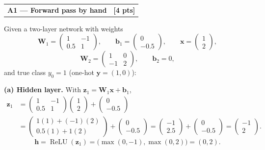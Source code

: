 \documentclass[10pt,a4paper]{article}
\makeatletter
\newcommand{\vect}[1]{\bm{#1}}
\newcommand{\qtitle}[2]{%
  \vspace{5pt}
  \noindent\begin{tabularx}{\linewidth}{@{}Xr@{}}
  {\sffamily\bfseries\color{AANavy}#1} & {\sffamily\bfseries\color{AANavy}#2}
  \end{tabularx}\vspace{1pt}
}
\makeatother
\begin{document}
\qtitle{A1 --- Forward pass by hand}{[4 pts]}
\begin{answerbox}
Given a two-layer network with weights
\[
\vect W_1=\begin{pmatrix}1&-1\\0.5&1\end{pmatrix},\qquad
\vect b_1=\begin{pmatrix}0\\-0.5\end{pmatrix},\qquad
\vect x=\begin{pmatrix}1\\2\end{pmatrix},
\]
\[
\vect W_2=\begin{pmatrix}1&0\\-1&2\end{pmatrix},\qquad
\vect b_2=0,
\]
and true class $y_0=1$ (one-hot $\vect y=(1,0)$):

\textbf{(a) Hidden layer.} With $\vect z_1=\vect W_1\vect x+\vect b_1$,
\[
\begin{aligned}
\vect z_1
&=\begin{pmatrix}1&-1\\0.5&1\end{pmatrix}\begin{pmatrix}1\\2\end{pmatrix}
 +\begin{pmatrix}0\\-0.5\end{pmatrix} \\
&=\begin{pmatrix}1(1)+(-1)(2)\\0.5(1)+1(2)\end{pmatrix}
 +\begin{pmatrix}0\\-0.5\end{pmatrix}
 =\begin{pmatrix}-1\\2.5\end{pmatrix}+\begin{pmatrix}0\\-0.5\end{pmatrix}
 =\begin{pmatrix}-1\\2\end{pmatrix}.
\end{aligned}
\]
\[
\vect h=\operatorname{ReLU}(\vect z_1)=\bigl(\max(0,-1),\max(0,2)\bigr)=(0,2).
\]


\end{answerbox}
\end{document}
